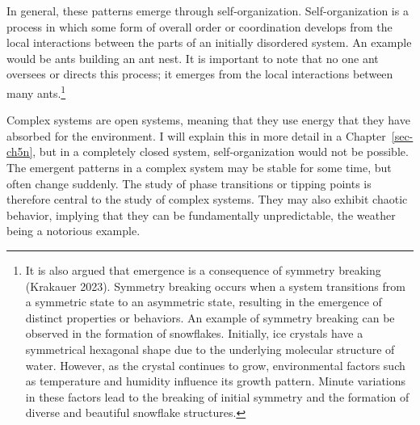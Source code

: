\documentclass[
  a4paper,
  DIV=11,
  numbers=noendperiod,
  oneside]{scrreprt}
\begin{document}
In general, these patterns emerge through self-organization.
Self-organization is a process in which some form of overall order or
coordination develops from the local interactions between the parts of
an initially disordered system. An example would be ants building an ant
nest. It is important to note that no one ant oversees or directs this
process; it emerges from the local interactions between many
ants.\footnote{It is also argued that emergence is a consequence of
  symmetry breaking (Krakauer 2023). Symmetry breaking occurs when a
  system transitions from a symmetric state to an asymmetric state,
  resulting in the emergence of distinct properties or behaviors. An
  example of symmetry breaking can be observed in the formation of
  snowflakes. Initially, ice crystals have a symmetrical hexagonal shape
  due to the underlying molecular structure of water. However, as the
  crystal continues to grow, environmental factors such as temperature
  and humidity influence its growth pattern. Minute variations in these
  factors lead to the breaking of initial symmetry and the formation of
  diverse and beautiful snowflake structures.}

Complex systems are open systems, meaning that they use energy that they
have absorbed for the environment. I will explain this in more detail in
a Chapter~\ref{sec-ch5n}, but in a completely closed system,
self-organization would not be possible. The emergent patterns in a
complex system may be stable for some time, but often change suddenly.
The study of phase transitions or tipping points is therefore central to
the study of complex systems. They may also exhibit chaotic behavior,
implying that they can be fundamentally unpredictable, the weather being
a notorious example.
\end{document}
